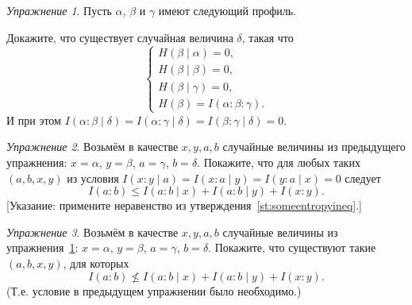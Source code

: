 \documentclass[12pt]{article}
\theoremstyle{definition}
\theoremstyle{plain}
\theoremstyle{remark}
\newtheorem{exercise}{Упражнение}[section]
\begin{document}
\begin{exercise}\label{ex:existsdelta}
    Пусть $\alpha$, $\beta$ и $\gamma$ имеют следующий профиль.
    \begin{center}
    \end{center}
    Докажите, что существует случайная величина $\delta$, такая что
    \[
        \begin{cases}
            H(\beta\mid\alpha) = 0,\\
            H(\beta\mid\beta)  = 0,\\
            H(\beta\mid\gamma) = 0,\\
            H(\beta) = I(\alpha:\beta:\gamma).
        \end{cases}
    \]
    И при этом $I(\alpha:\beta\mid\delta) = I(\alpha:\gamma\mid\delta) = I(\beta:\gamma\mid\delta) =
    0$.
\end{exercise}
\begin{exercise}
    Возьмём в качестве $x,y,a,b$ случайные величины из предыдущего упражнения: $x=\alpha$,
    $y=\beta$, $a=\gamma$, $b=\delta$. Покажите, что для любых таких $(a,b,x,y)$ из условия
    $I(x:y\mid a) = I(x:a\mid y) = I(y:a\mid x) = 0$ следует 
    \[
        I(a:b)\le I(a:b\mid x) + I(a:b\mid y) + I(x:y).     
    \]
    [Указание: примените неравенство из утверждения~\ref{st:someentropyineq}.]
\end{exercise}
\begin{exercise} 
    Возьмём в качестве $x,y,a,b$ случайные величины из упражнения~\ref{ex:existsdelta}: $x=\alpha$,
    $y=\beta$, $a=\gamma$, $b=\delta$. Покажите, что существуют такие $(a,b,x,y)$, для которых 
    \[
        I(a:b)\not\le I(a:b\mid x) + I(a:b\mid y) + I(x:y).     
    \]
    (Т.е. условие в предыдущем упражнении было необходимо.)
\end{exercise}
\end{document}
